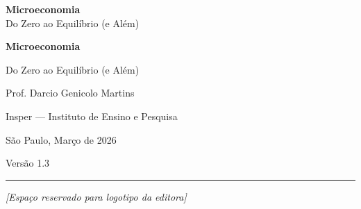 \documentclass[11pt,twoside,openright]{book}
\begin{document}
\begin{titlepage}
\begin{center}
\vspace*{8cm}
{\fontsize{28}{34}\selectfont\sffamily\bfseries\textcolor{insper}{Microeconomia}}\\[0.5cm]
{\fontsize{14}{18}\selectfont\sffamily Do Zero ao Equilíbrio (e Além)}
\end{center}
\end{titlepage}

\begin{titlepage}
\begin{center}
\vspace*{3cm}

{\fontsize{32}{38}\selectfont\sffamily\bfseries\textcolor{insper}{Microeconomia}}

\vspace{0.4cm}

{\fontsize{16}{20}\selectfont\sffamily Do Zero ao Equilíbrio (e Além)}

\vspace{2cm}

{\large\sffamily Prof. Darcio Genicolo Martins}

{\normalsize\sffamily Insper — Instituto de Ensino e Pesquisa}

\vspace{1cm}

{\normalsize\sffamily São Paulo, Março de 2026}

\vspace{0.5cm}

{\normalsize\sffamily Versão 1.3}

\vspace{4cm}

\rule{0.4\textwidth}{0.5pt}

\vspace{0.3cm}

{\small\itshape [Espaço reservado para logotipo da editora]}

\end{center}
\end{titlepage}
\end{document}

